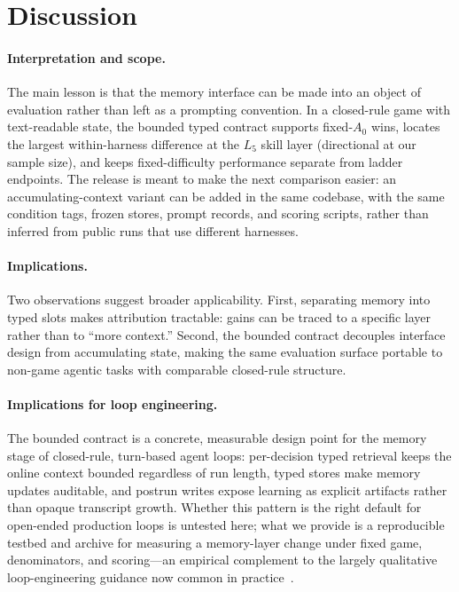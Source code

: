 \section{Discussion}
\label{sec:discussion}

\paragraph{Interpretation and scope.}
The main lesson is that the memory interface can be made into an
object of evaluation rather than left as a prompting convention. In
a closed-rule game with text-readable state, the bounded typed
contract supports fixed-$A_0$ wins, locates the largest
within-harness difference at the $L_5$ skill layer (directional at
our sample size), and keeps fixed-difficulty performance separate
from ladder endpoints. The release is meant to
make the next comparison easier: an accumulating-context variant can
be added in the same codebase, with the same condition tags, frozen
stores, prompt records, and scoring scripts, rather than inferred
from public runs that use different harnesses.

\paragraph{Implications.}
Two observations suggest broader applicability. First, separating
memory into typed slots makes attribution tractable: gains can be
traced to a specific layer rather than to ``more context.'' Second,
the bounded contract decouples interface design from accumulating
state, making the same evaluation surface portable to non-game
agentic tasks with comparable closed-rule structure.

\paragraph{Implications for loop engineering.}
The bounded contract is a concrete, measurable design point for the memory
stage of closed-rule, turn-based agent loops: per-decision typed retrieval
keeps the online context bounded regardless of run length, typed stores make
memory updates auditable, and postrun writes expose learning as explicit
artifacts rather than opaque transcript growth. Whether this pattern is the
right default for open-ended production loops is untested here; what we provide
is a reproducible testbed and archive for measuring a memory-layer change under
fixed game, denominators, and scoring---an empirical complement to the largely
qualitative loop-engineering guidance now common in
practice~\citep{anthropic-context-2025,memory-survey-2025}.
